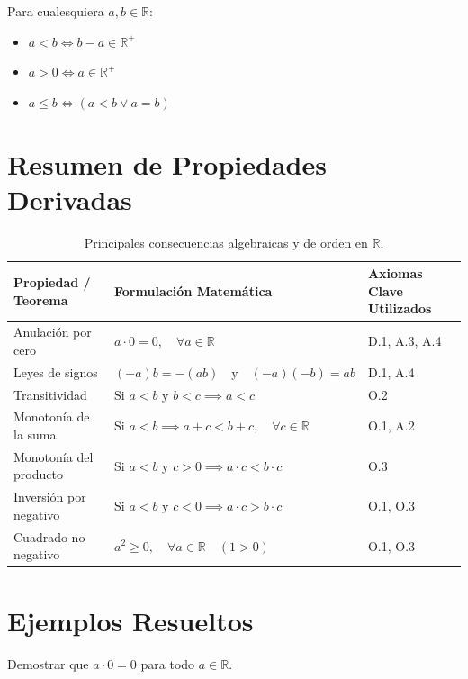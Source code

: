 \begin{definicion}
Para cualesquiera $a, b \in \mathbb{R}$:
\begin{itemize}
    \item $a < b \iff b - a \in \mathbb{R}^+$
    \item $a > 0 \iff a \in \mathbb{R}^+$
    \item $a \le b \iff (a < b \lor a = b)$
\end{itemize}
\end{definicion}

\section{Resumen de Propiedades Derivadas}

\begin{table}[h!]
\centering
\small
\begin{tabular}{lll}
\hline
\textbf{Propiedad / Teorema} & \textbf{Formulación Matemática} & \textbf{Axiomas Clave Utilizados} \\
\hline
Anulación por cero & $a \cdot 0 = 0, \quad \forall a \in \mathbb{R}$ & D.1, A.3, A.4 \\
Leyes de signos & $(-a)b = -(ab) \quad \text{y} \quad (-a)(-b) = ab$ & D.1, A.4 \\
Transitividad & Si $a < b$ y $b < c \implies a < c$ & O.2 \\
Monotonía de la suma & Si $a < b \implies a + c < b + c, \quad \forall c \in \mathbb{R}$ & O.1, A.2 \\
Monotonía del producto & Si $a < b$ y $c > 0 \implies a \cdot c < b \cdot c$ & O.3 \\
Inversión por negativo & Si $a < b$ y $c < 0 \implies a \cdot c > b \cdot c$ & O.1, O.3 \\
Cuadrado no negativo & $a^2 \ge 0, \quad \forall a \in \mathbb{R} \quad (1 > 0)$ & O.1, O.3 \\
\hline
\end{tabular}
\caption{Principales consecuencias algebraicas y de orden en $\mathbb{R}$.}
\end{table}

\section{Ejemplos Resueltos}

\begin{ejemplo}
Demostrar que $a \cdot 0 = 0$ para todo $a \in \mathbb{R}$.
\end{ejemplo}

